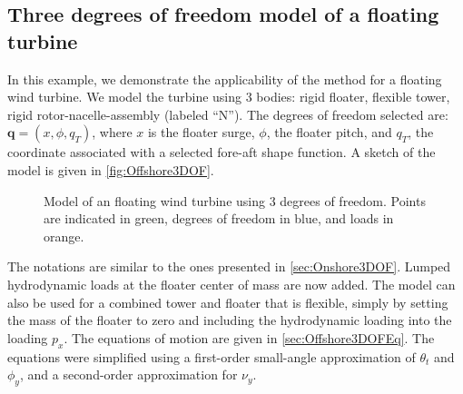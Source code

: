 \documentclass[wes, manuscript]{copernicus}
\renewcommand{\v}[1]{\boldsymbol{#1}}
\begin{document}
\subsection{Three degrees of freedom model of a floating turbine}
\label{sec:Offshore3DOF}
In this example, we demonstrate the applicability of the method for a floating wind turbine.
We model the turbine using 3 bodies: rigid floater, flexible tower, rigid rotor-nacelle-assembly (labeled ``N'').
The degrees of freedom selected are: $\v{q}=(x,\phi,q_T)$, where $x$ is the floater surge, $\phi$, the floater pitch, and $q_T$, the coordinate associated with a selected fore-aft shape function. 
A sketch of the model is given in \autoref{fig:Offshore3DOF}. 
\begin{figure}[!htb]%
 \centering%
 \def\svgwidth{0.6\columnwidth}%
 \caption{Model of an floating wind turbine using 3 degrees of freedom. Points are indicated in green, degrees of freedom in blue, and loads in orange.}\label{fig:Offshore3DOF}%
 \end{figure}%
The notations are similar to the ones presented in \autoref{sec:Onshore3DOF}.
Lumped hydrodynamic loads at the floater center of mass are now added.
The model can also be used for a combined tower and floater that is flexible, simply by setting the mass of the floater to zero and including the hydrodynamic loading into the loading $p_x$.
The equations of motion are given in \autoref{sec:Offshore3DOFEq}.
The equations were simplified using a first-order small-angle approximation of $\theta_t$ and $\phi_y$, and a second-order approximation for $\nu_y$.
\end{document}

